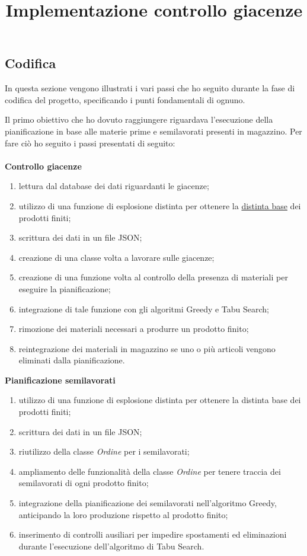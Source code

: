 \subsection{Codifica}

In questa sezione vengono illustrati i vari passi che ho seguito durante la fase di codifica del progetto, specificando i punti fondamentali di ognuno.\\

\title{Implementazione controllo giacenze}

Il primo obiettivo che ho dovuto raggiungere riguardava l'esecuzione della pianificazione in base alle materie prime e semilavorati presenti in magazzino.
Per fare ciò ho seguito i passi presentati di seguito:\\ \\
\textbf{Controllo giacenze}
\begin{enumerate}
        \item lettura dal database dei dati riguardanti le giacenze;
        \item utilizzo di una funzione di esplosione distinta per ottenere la \hyperref[Distinta base]{distinta base\glo} dei prodotti finiti; 
        \item scrittura dei dati in un file JSON;
        \item creazione di una classe volta a lavorare sulle giacenze;
        \item creazione di una funzione volta al controllo della presenza di materiali per eseguire la pianificazione;
        \item integrazione di tale funzione con gli algoritmi Greedy e Tabu Search;
        \item rimozione dei materiali necessari a produrre un prodotto finito;
        \item reintegrazione dei materiali in magazzino se uno o più articoli vengono eliminati dalla pianificazione.\\
\end{enumerate}

\textbf{Pianificazione semilavorati} 
\begin{enumerate}
        \item utilizzo di una funzione di esplosione distinta per ottenere la distinta base dei prodotti finiti; 
        \item scrittura dei dati in un file JSON;
        \item riutilizzo della classe \textit{Ordine} per i semilavorati;
        \item ampliamento delle funzionalità della classe \textit{Ordine} per tenere traccia dei semilavorati di ogni prodotto finito;
        \item integrazione della pianificazione dei semilavorati nell'algoritmo Greedy, anticipando la loro produzione rispetto al prodotto finito;
        \item inserimento di controlli ausiliari per impedire spostamenti ed eliminazioni durante l'esecuzione dell'algoritmo di Tabu Search.\\
\end{enumerate}

